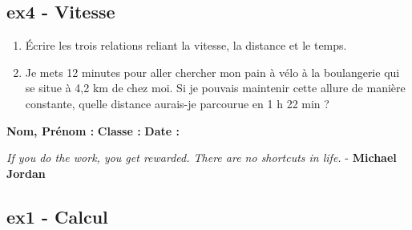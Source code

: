 \documentclass[12pt]{article}
\begin{document}
\subsection*{ex4 - Vitesse}

\begin{enumerate}
\item Écrire les trois relations reliant la vitesse, la distance et le temps.
\item Je mets 12 minutes pour aller chercher mon pain à vélo à la boulangerie qui se situe à 4,2 km de chez moi. Si je pouvais maintenir cette allure de
  manière constante, quelle distance aurais-je parcourue en 1 h 22 min ?
\end{enumerate}
\Pointilles[15]

\newpage

\textbf{Nom, Prénom :} \hspace{8cm} \textbf{Classe :} \hspace{3cm} \textbf{Date :}\\

\begin{center}
  \textit{If you do the work, you get rewarded. There are no shortcuts in life.}  - \textbf{Michael Jordan}
\end{center}


\subsection*{ex1 - Calcul}
\end{document}
